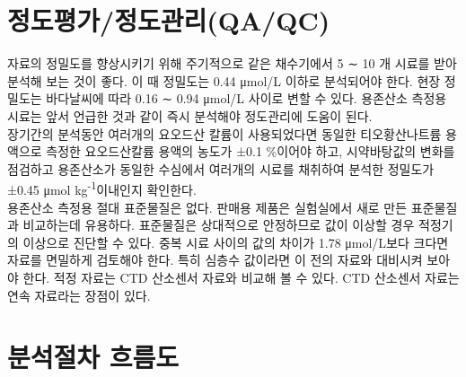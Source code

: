\documentclass[
]{book}
\begin{document}
\hypertarget{uxc815uxb3c4uxd3c9uxac00uxc815uxb3c4uxad00uxb9acqaqc}{%
\chapter{정도평가/정도관리(QA/QC)}\label{uxc815uxb3c4uxd3c9uxac00uxc815uxb3c4uxad00uxb9acqaqc}}

자료의 정밀도를 향상시키기 위해 주기적으로 같은 채수기에서 5 ∼ 10 개 시료를 받아 분석해 보는 것이 좋다. 이 때 정밀도는 0.44 μmol/L 이하로 분석되어야 한다. 현장 정밀도는 바다날씨에 따라 0.16 ∼ 0.94 μmol/L 사이로 변할 수 있다. 용존산소 측정용 시료는 앞서 언급한 것과 같이 즉시 분석해야 정도관리에 도움이 된다.\\
장기간의 분석동안 여러개의 요오드산 칼륨이 사용되었다면 동일한 티오황산나트륨 용액으로 측정한 요오드산칼륨 용액의 농도가 ±0.1 \%이어야 하고, 시약바탕값의 변화를 점검하고 용존산소가 동일한 수심에서 여러개의 시료를 채취하여 분석한 정밀도가 ±0.45 μmol kg\textsuperscript{-1}이내인지 확인한다.\\
용존산소 측정용 절대 표준물질은 없다. 판매용 제품은 실험실에서 새로 만든 표준물질과 비교하는데 유용하다. 표준물질은 상대적으로 안정하므로 값이 이상할 경우 적정기의 이상으로 진단할 수 있다. 중복 시료 사이의 값의 차이가 1.78 μmol/L보다 크다면 자료를 면밀하게 검토해야 한다. 특히 심층수 값이라면 이 전의 자료와 대비시켜 보아야 한다. 적정 자료는 CTD 산소센서 자료와 비교해 볼 수 있다. CTD 산소센서 자료는 연속 자료라는 장점이 있다.

\hypertarget{uxbd84uxc11duxc808uxcc28-uxd750uxb984uxb3c4}{%
\chapter{분석절차 흐름도}\label{uxbd84uxc11duxc808uxcc28-uxd750uxb984uxb3c4}}

  
\end{document}
